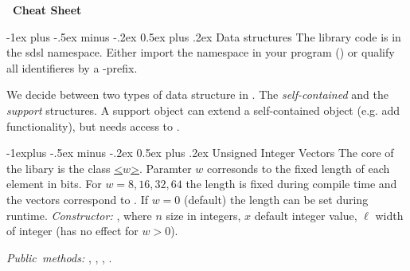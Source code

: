 \documentclass[10pt,landscape]{article}
\makeatletter
\renewcommand{\section}{\@startsection{section}{1}{0mm}%
                                {-1ex plus -.5ex minus -.2ex}%
                                {0.5ex plus .2ex}%
                                {\normalfont\large\bfseries}}
\renewcommand{\subsection}{\@startsection{subsection}{2}{0mm}%
                                {-1explus -.5ex minus -.2ex}%
                                {0.5ex plus .2ex}%
                                {\normalfont\normalsize\bfseries}}
\makeatother
\begin{document}
\begin{multicols}{3}
\begin{center}
     \Large{\textbf{\sdsl\ Cheat Sheet}} \\
\end{center}

\section{Data structures}
The library code is in the sdsl namespace. Either import
the namespace in your program () or
qualify all identifieres by a -prefix.

We decide between two types of data structure in \sdsl.
The \emph{self-contained} and the \emph{support}
structures. A support object  can extend
a self-contained object  (e.g. add functionality), but 
needs access to . 

\subsection{Unsigned Integer Vectors}
The core of the libary is the class 
\href{\sdslgit/include/sdsl/int_vector.hpp}{\sdslintvector\textless$w$\textgreater}.
Paramter $w$ corresonds to the fixed length of each
element in bits.  For $w=8,16,32,64$ the length is
fixed during compile time and the vectors
correspond to \href{http://www.sgi.com/tech/stl/Vector.html}{}. 
If $w=0$ (default) the length can be set during runtime.
\textit{Constructor:} \sdslintvectorZ{}, where
$n$ size in integers, $x$ default integer value, $\ell$ width
of integer (has no effect for $w>0$).

\textit{Public~methods:} , , , 
. 


\end{multicols}
\end{document}
